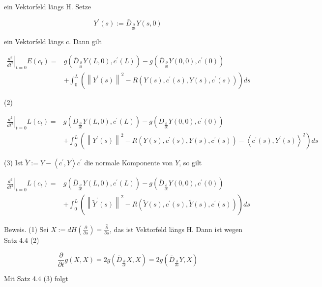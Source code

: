 \documentclass[10pt, letterpaper]{article}
\begin{document}
ein Vektorfeld längs H. Setze

$$
Y^{\prime}(s):=\bar{D}_{\frac{\partial}{\partial s}} Y(s, 0)
$$

ein Vektorfeld längs c. Dann gilt


\begin{align*}
\left.\frac{d^{2}}{d t^{2}}\right|_{t=0} E\left(c_{t}\right)= & g\left(\bar{D}_{\frac{\partial}{\partial t}} Y(L, 0), c^{\prime}(L)\right)-g\left(\bar{D}_{\frac{\partial}{\partial t}} Y(0,0), c^{\prime}(0)\right)  \tag{1}\\
& +\int_{0}^{L}\left(\left\|Y^{\prime}(s)\right\|^{2}-R\left(Y(s), c^{\prime}(s), Y(s), c^{\prime}(s)\right)\right) d s
\end{align*}


(2)

$$
\begin{aligned}
\left.\frac{d^{2}}{d t^{2}}\right|_{t=0} L\left(c_{t}\right)= & g\left(\bar{D}_{\frac{\partial}{\partial t}} Y(L, 0), c^{\prime}(L)\right)-g\left(\bar{D}_{\frac{\partial}{\partial t}} Y(0,0), c^{\prime}(0)\right) \\
& +\int_{0}^{L}\left(\left\|Y^{\prime}(s)\right\|^{2}-R\left(Y(s), c^{\prime}(s), Y(s), c^{\prime}(s)\right)-\left\langle c^{\prime}(s), Y^{\prime}(s)\right\rangle^{2}\right) d s
\end{aligned}
$$

(3) Ist $\tilde{Y}:=Y-\left\langle c^{\prime}, Y\right\rangle c^{\prime}$ die normale Komponente von $Y$, so gilt

$$
\begin{aligned}
\left.\frac{d^{2}}{d t^{2}}\right|_{t=0} L\left(c_{t}\right)= & g\left(\bar{D}_{\frac{\partial}{\partial t}} Y(L, 0), c^{\prime}(L)\right)-g\left(\bar{D}_{\frac{\partial}{\partial t}} Y(0,0), c^{\prime}(0)\right) \\
& +\int_{0}^{L}\left(\left\|\tilde{Y}^{\prime}(s)\right\|^{2}-R\left(\tilde{Y}(s), c^{\prime}(s), \tilde{Y}(s), c^{\prime}(s)\right)\right) d s
\end{aligned}
$$

Beweis. (1) Sei $X:=d H\left(\frac{\partial}{\partial s}\right)=\overline{\frac{\partial}{\partial s}}$, das ist Vektorfeld längs H. Dann ist wegen Satz 4.4 (2)

$$
\frac{\partial}{\partial t} g(X, X)=2 g\left(\bar{D}_{\frac{\partial}{\partial t}} X, X\right)=2 g\left(\bar{D}_{\frac{\partial}{\partial s}} Y, X\right)
$$

Mit Satz 4.4 (3) folgt
\end{document}
